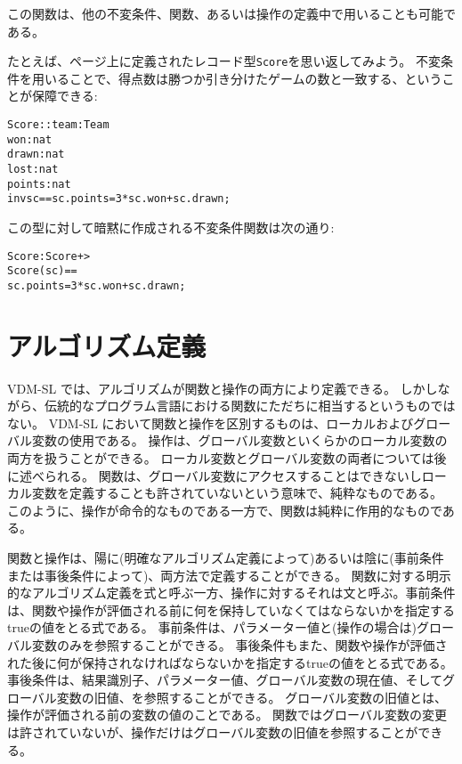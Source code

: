 \documentclass[\pformat,12pt]{jarticle}
\newcommand{\vdmslpp}[2]{%
#1
}
\newcommand{\vdmsl}{VDM-SL}
\newcommand{\vdmpp}{VDM++}
\begin{document}
この関数は、他の不変条件、関数、あるいは操作の定義中で用いることも可能である。

たとえば、\pageref{scoredef}ページ上に定義されたレコード型\texttt{Score}を思い返してみよう。
不変条件を用いることで、得点数は勝つか引き分けたゲームの数と一致する、ということが保障できる:
\begin{alltt}
  Score :: team : Team
           won : nat
           drawn : nat
           lost : nat
           points : nat
  inv sc == sc.points = 3 * sc.won + sc.drawn;
\end{alltt}
この型に対して暗黙に作成される不変条件関数は次の通り:
\begin{alltt}
  Score : Score +> 
  Score (sc) == 
    sc.points = 3 * sc.won + sc.drawn;
\end{alltt}

\section{アルゴリズム定義}
\label{algorithm}


\vdmslpp{\vdmsl}{\vdmpp}では、アルゴリズムが関数と操作の両方により定義できる。 
しかしながら、伝統的なプログラム言語における関数にただちに相当するというものではない。
\vdmslpp{\vdmsl}{\vdmpp}において関数と操作を区別するものは、ローカルおよびグローバル変数の使用である。
操作は、グローバル変数といくらかのローカル変数の両方を扱うことができる。
ローカル変数とグローバル変数の両者については後に述べられる。
関数は、グローバル変数にアクセスすることはできないしローカル変数を定義することも許されていないという意味で、純粋なものである。
このように、操作が命令的なものである一方で、関数は純粋に作用的なものである。

関数と操作は、陽に(明確なアルゴリズム定義によって)あるいは陰に(事前条件または事後条件によって)、両方法で定義することができる。
関数に対する明示的なアルゴリズム定義を式と呼ぶ一方、操作に対するそれは文と呼ぶ。事前条件は、関数や操作が評価される前に何を保持していなくてはならないかを指定するtrueの値をとる式である。
事前条件は、パラメーター値と(操作の場合は)グローバル変数のみを参照することができる。
事後条件もまた、関数や操作が評価された後に何が保持されなければならないかを指定するtrueの値をとる式である。
事後条件は、結果識別子、パラメーター値、グローバル変数の現在値、そしてグローバル変数の旧値、を参照することができる。
グローバル変数の旧値とは、操作が評価される前の変数の値のことである。
関数ではグローバル変数の変更は許されていないが、操作だけはグローバル変数の旧値を参照することができる。
\end{document}
